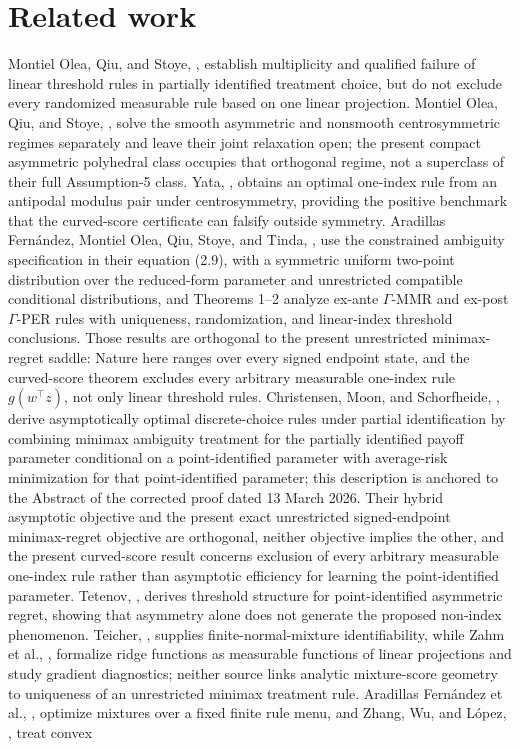 \documentclass{article}
\begin{document}
\section{Related work}

Montiel Olea, Qiu, and Stoye, \cite{MontielOleaQiuStoye2026Decision}, establish multiplicity and qualified failure of linear threshold rules in partially identified treatment choice, but do not exclude every randomized measurable rule based on one linear projection. Montiel Olea, Qiu, and Stoye, \cite{MontielOleaQiuStoye2026Local}, solve the smooth asymmetric and nonsmooth centrosymmetric regimes separately and leave their joint relaxation open; the present compact asymmetric polyhedral class occupies that orthogonal regime, not a superclass of their full Assumption-5 class. Yata, \cite{Yata2025Optimal}, obtains an optimal one-index rule from an antipodal modulus pair under centrosymmetry, providing the positive benchmark that the curved-score certificate can falsify outside symmetry. Aradillas Fernández, Montiel Olea, Qiu, Stoye, and Tinda, \cite{AradillasFernandezMontielOleaQiuStoyeTinda2026RobustBayes}, use the constrained ambiguity specification in their equation (2.9), with a symmetric uniform two-point distribution over the reduced-form parameter and unrestricted compatible conditional distributions, and Theorems 1--2 analyze ex-ante \(\Gamma\)-MMR and ex-post \(\Gamma\)-PER rules with uniqueness, randomization, and linear-index threshold conclusions. Those results are orthogonal to the present unrestricted minimax-regret saddle: Nature here ranges over every signed endpoint state, and the curved-score theorem excludes every arbitrary measurable one-index rule \(g(w^{\top}z)\), not only linear threshold rules. Christensen, Moon, and Schorfheide, \cite{ChristensenMoonSchorfheide2026OptimalDecisionRules}, derive asymptotically optimal discrete-choice rules under partial identification by combining minimax ambiguity treatment for the partially identified payoff parameter conditional on a point-identified parameter with average-risk minimization for that point-identified parameter; this description is anchored to the Abstract of the corrected proof dated 13 March 2026. Their hybrid asymptotic objective and the present exact unrestricted signed-endpoint minimax-regret objective are orthogonal, neither objective implies the other, and the present curved-score result concerns exclusion of every arbitrary measurable one-index rule rather than asymptotic efficiency for learning the point-identified parameter. Tetenov, \cite{Tetenov2012Asymmetric}, derives threshold structure for point-identified asymmetric regret, showing that asymmetry alone does not generate the proposed non-index phenomenon. Teicher, \cite{Teicher1963Mixtures}, supplies finite-normal-mixture identifiability, while Zahm et al., \cite{ZahmEtAl2020Ridge}, formalize ridge functions as measurable functions of linear projections and study gradient diagnostics; neither source links analytic mixture-score geometry to uniqueness of an unrestricted minimax treatment rule. Aradillas Fernández et al., \cite{AradillasFernandezEtAl2025Epsilon}, optimize mixtures over a fixed finite rule menu, and Zhang, Wu, and López, \cite{ZhangWuLopez2010Exchange}, treat convex 
\end{document}
